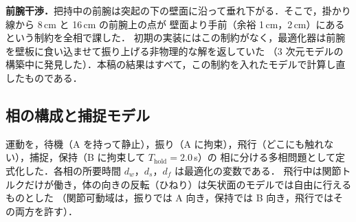 \begin{table}[t]
\centering\scriptsize
\caption{モデルの定数．トルク上限は左右の合計．可動域は隣り合うリンクの角度差で，A に向いているときの値である（B に向くと符号が反転する）．}
\label{tab:constants}
\end{table}

\textbf{前腕干渉．}把持中の前腕は突起の下の壁面に沿って垂れ下がる．そこで，掛かり線から 8\,cm と 16\,cm の前腕上の点が
壁面より手前（余裕 1\,cm，2\,cm）にあるという制約を全相で課した．
初期の実装にはこの制約がなく，最適化器は前腕を壁板に食い込ませて振り上げる非物理的な解を返していた
（3 次元モデルの構築中に発見した）．本稿の結果はすべて，この制約を入れたモデルで計算し直したものである．

\subsection{相の構成と捕捉モデル}
運動を，待機（A を持って静止），振り（A に拘束），飛行（どこにも触れない），捕捉，保持（B に拘束して $T_{\mathrm{hold}}=2.0$\,s）の
相に分ける多相問題として定式化した．各相の所要時間 $d_w$，$d_s$，$d_f$ は最適化の変数である．
飛行中は関節トルクだけが働き，体の向きの反転（ひねり）は矢状面のモデルでは自由に行えるものとした
（関節可動域は，振りでは A 向き，保持では B 向き，飛行ではその両方を許す）．

